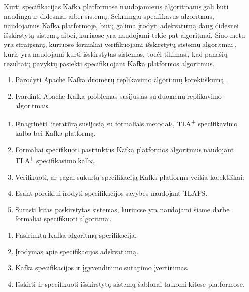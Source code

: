 \documentclass{VUMIFPSmagistrinis}
\begin{document}
		
		Kurti specifikacijas Kafka platformose naudojamiems algoritmams gali būti naudinga ir didesniai aibei sistemų. 
		Sėkmingai specifikavus algoritmus, naudojamus Kafka platformoje, būtų galima įrodyti adekvatumą daug didesnei išskirstytų sistemų aibei, kuriuose yra naudojami tokie pat algoritmai. 
		Šiuo metu yra straipsnių, kuriuose formaliai verifikuojami išskirstytų sistemų algoritmai \cite{lamport2005generalized}, kurie yra naudojami kurti išskirstytas sistemas, todėl tikimasi, kad panašių rezultatų pavyktų pasiekti specifikuojant Kafka platformos algoritmus.
	
		\begin{enumerate}
			\item{Parodyti Apache Kafka duomenų replikavimo algoritmų korektiškumą.}
			\item{Įvardinti Apache Kafka problemas susijusias su duomenų replikavimo algoritmais.}
		\end{enumerate}	

	
		\begin{enumerate}
			\item{Išnagrinėti literatūrą susijusią su formaliais metodais, TLA\textsuperscript{+} specifikavimo kalba bei Kafka platformą.}
			\item{Formaliai specifikuoti pasirinktus Kafka platformos algoritmus naudojant TLA\textsuperscript{+} specifikavimo kalbą.}
			\item{Verifikuoti, ar pagal sukurtą specifikaciją Kafka platforma veikia korektiškai.}
			\item{Esant poreikiui įrodyti specifikacijos savybes naudojant TLAPS.}
			\item{Surasti kitas paskirstytas sistemas, kuriuose yra naudojami šiame darbe formaliai specifikuoti algoritmai.}
		\end{enumerate}
	
		\begin{enumerate}
			\item{Pasirinktų Kafka algoritmų specifikacija.}
			\item{Įrodymas apie specifikacijos adekvatumą.}
			\item{Kafka
 specifikacijos ir įgyvendinimo sutapimo įvertinimas.}
			\item{Išskirti ir specifikuoti išskirstytų sistemų šablonai taikomi kitose platformose.}
		\end{enumerate}
	\pagebreak
	\printbibliography[heading=bibintoc] 
\end{document}
